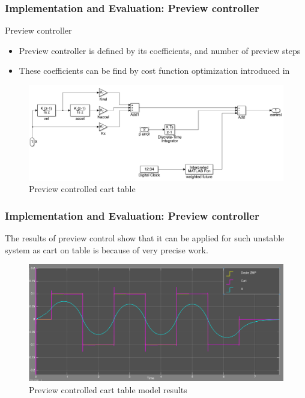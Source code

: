 \documentclass{beamer}
\begin{document}
	\begin{frame}
		\frametitle{Implementation and Evaluation: Preview controller}
		\begin{block}{Preview controller}
			\begin{itemize}
				\item
					Preview controller is defined by its coefficients, and number of preview steps
				\item
					These coefficients can be find by cost function optimization introduced in \cite{katayama1985design} 
			\end{itemize}
		\end{block}
		
		\begin{figure}[h!]
			\centering
			\includegraphics[width=0.8\linewidth]{presentation_images/23}
			\caption{Preview controlled cart table}
		\end{figure}
	\end{frame}
	

	\begin{frame}
		\frametitle{Implementation and Evaluation: Preview controller}
		The results of preview control show that it can be applied for such unstable system as cart on table is because of very precise work.
		
		\begin{figure}[h!]
			\centering
			\includegraphics[width=0.8\linewidth]{presentation_images/24}
			\caption{Preview controlled cart table model results}
		\end{figure}
	\end{frame}
	
\end{document}
